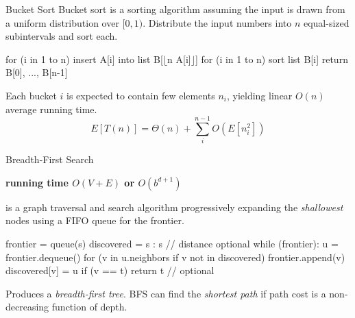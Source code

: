 \documentclass{cognito}
\begin{document}
\begin{note}{Bucket Sort}
	Bucket sort is a sorting algorithm assuming the input is drawn from a uniform distribution over $[0, 1)$.
	Distribute the input numbers into $n$ equal-sized subintervals and sort each.
	\begin{largecode}
 for (i in 1 to n) insert A[i] into list B[$\lfloor$n A[i]$\rfloor$]
 for (i in 1 to n) sort list B[i]
 return B[0], ..., B[n-1]
	\end{largecode}
	\begin{remark} Each bucket $i$ is expected to contain few elements $n_i$, yielding linear $O(n)$ average running time.
	$$ E\left[T(n)\right] = \Theta(n) + \sum_i^{n-1} O(E[n_i^2])$$
	\end{remark}\vspace{-10pt}
\end{note}


\begin{note}{Breadth-First Search}
	\begin{mdframed}[linecolor=black!25!white]
		\bf running time $O(V + E)$ or $O(b^{d+1})$
	\end{mdframed}
	 is a graph traversal and search algorithm progressively expanding the \emph{shallowest} nodes using a FIFO queue for the frontier.
	\begin{largecode}
 frontier = queue(s)
 discovered = {s : s}         // distance optional
 while (frontier):
 	u = frontier.dequeue()
	for (v in u.neighbors if v not in discovered)
		frontier.append(v)
		discovered[v] = u
		if (v == t) return t  // optional
	\end{largecode}%
	\begin{remark} Produces a \emph{breadth-first tree}.
	BFS can find the \emph{shortest path} if path cost is a non-decreasing function of depth. \end{remark}
	\vspace{-5pt}
\end{note}

\end{document}
